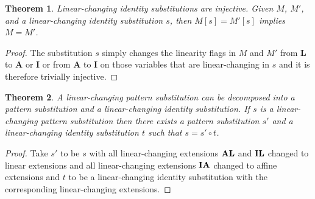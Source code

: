 \documentclass{eptcs}
\newcommand\fI{\textup{$\mathbf{I}$}}
\newcommand\fA{\textup{$\mathbf{A}$}}
\newcommand\fL{\textup{$\mathbf{L}$}}
\newtheorem{thm}{Theorem}[section]
\theoremstyle{definition}
\begin{document}
\begin{thm}\label{thm:injective}
Linear-changing identity substitutions are injective.
Given $M$, $M'$, and a linear-changing identity substitution $s$,
then $M[s]=M'[s]$ implies $M=M'$.
\end{thm}
\begin{proof}
The substitution $s$ simply changes the linearity flags in $M$ and $M'$ from
\fL{} to \fA{} or \fI{} or from \fA{} to \fI{} on
those variables that are linear-changing in
$s$ and it is therefore trivially injective.
\end{proof}

\begin{thm}\label{thm:decompose}
A linear-changing pattern substitution can be decomposed into a pattern
substitution and a linear-changing identity substitution.
If $s$ is a linear-changing pattern substitution then there exists a
pattern substitution $s'$ and a linear-changing identity substitution
$t$ such that $s=s'\circ t$.
\end{thm}
\begin{proof}
Take $s'$ to be $s$ with all linear-changing extensions $\fA\fL$ and
$\fI\fL$ changed to
linear extensions and all linear-changing extensions $\fI\fA$ changed to
affine extensions and $t$ to be a linear-changing identity substitution
with the corresponding linear-changing extensions.
\end{proof}
\end{document}
